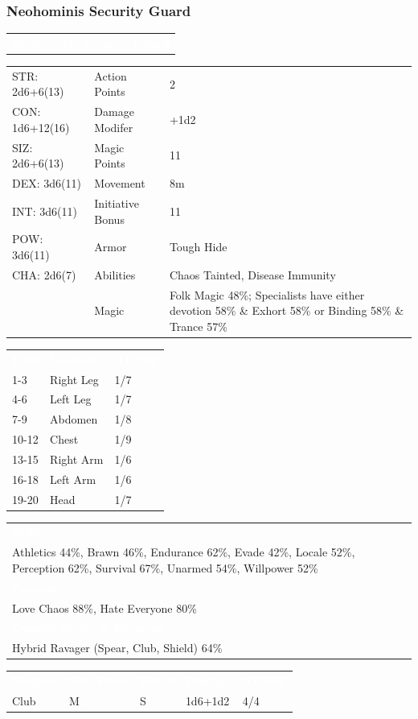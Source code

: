 \documentclass[letterpaper,serif]{rpg-module}
\begin{document}
\subsubsection{Neohominis Security Guard}

\lipsum[1]

\vspace{12pt}

\noindent\begin{tabularx}{\linewidth}{X}
\rowcolor{gray}
\textcolor{white}{\textbf{Neohominis Security Guard}}
\end{tabularx}
\begin{tabularx}{\linewidth}{XXX}
STR: 2d6+6(13) & Action Points & 2 \\
CON: 1d6+12(16) & Damage Modifer & +1d2 \\
SIZ: 2d6+6(13) & Magic Points & 11 \\
DEX: 3d6(11) & Movement & 8m \\
INT: 3d6(11) & Initiative Bonus & 11 \\
POW: 3d6(11) & Armor & Tough Hide \\
CHA: 2d6(7) & Abilities & Chaos Tainted, Disease Immunity \\
    & Magic & Folk Magic 48\%; Specialists have either devotion 58\% \& Exhort 58\% or Binding 58\% \& Trance 57\%
\end{tabularx}
\begin{tabularx}{\linewidth}{XXX}
\rowcolor{gray}
\textcolor{white}{\textbf{1d20}} & \textcolor{white}{\textbf{Location}} & \textcolor{white}{\textbf{AP/HP}} \\
1-3 & Right Leg & 1/7 \\
4-6 & Left Leg & 1/7 \\
7-9 & Abdomen & 1/8 \\
10-12 & Chest & 1/9 \\
13-15 & Right Arm & 1/6 \\
16-18 & Left Arm & 1/6 \\
19-20 & Head & 1/7 
\end{tabularx}
\begin{tabularx}{\linewidth}{X}
\rowcolor{gray}
\textcolor{white}{\textbf{Skills}} \\
Athletics 44\%, Brawn 46\%, Endurance 62\%, Evade 42\%, Locale 52\%, Perception 62\%, Survival 67\%, Unarmed 54\%, Willpower 52\%\\
\rowcolor{gray}
\textcolor{white}{\textbf{Passions}} \\
Love Chaos 88\%, Hate Everyone 80\% \\
\rowcolor{gray}
\textcolor{white}{\textbf{Combat Styles \& Weapons}} \\
Hybrid Ravager (Spear, Club, Shield) 64\%
\end{tabularx}
\begin{tabularx}{\linewidth}{XXXXX}
\rowcolor{gray}
\textcolor{white}{\textbf{Weapon}} & \textcolor{white}{\textbf{Size/Force}} & \textcolor{white}{\textbf{Reach}} & \textcolor{white}{\textbf{Damage}} & \textcolor{white}{\textbf{AP/HP}} \\
Club & M & S & 1d6+1d2 & 4/4
\end{tabularx}
\end{document}
